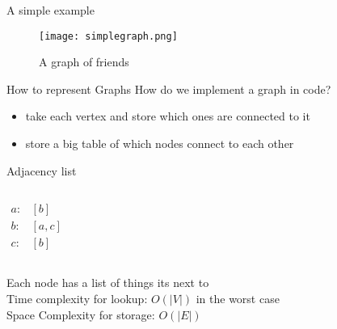 \documentclass{beamer}
\begin{document}
  \begin{frame}{A simple example}
      \begin{figure}
          \centering
          \texttt{[image: simplegraph.png]}
          \caption{A graph of friends}
          \label{fig:my_label}
      \end{figure}
  \end{frame}
  \begin{frame}{How to represent Graphs}
      How do we implement a graph in code?
      \begin{itemize}
          \item take each vertex and store which ones are connected to it
          \item store a big table of which nodes connect to each other
      \end{itemize}
  \end{frame}
  \begin{frame}{Adjacency list}
                \begin{columns}
    
        \begin{align*}
            a:& [b] \\
            b:& [a,c] \\
            c:& [b]
        \end{align*}
    \end{columns}
    \vspace{1cm}
    \centering
        Each node has a list of things its next to\\
        Time complexity for lookup: $O(|V|)$ in the worst case \\
        Space Complexity for storage: $O(|E|)$
  \end{frame}
\end{document}
